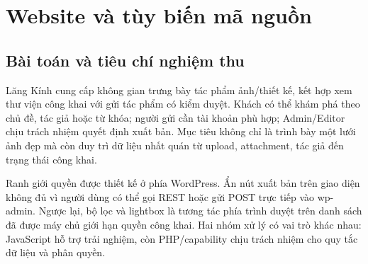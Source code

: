 \chapter{Website và tùy biến mã nguồn}
\label{ch:web}
\section{Bài toán và tiêu chí nghiệm thu}
Lăng Kính cung cấp không gian trưng bày tác phẩm ảnh/thiết kế, kết hợp xem thư viện công khai với gửi tác phẩm có kiểm duyệt. Khách có thể khám phá theo chủ đề, tác giả hoặc từ khóa; người gửi cần tài khoản phù hợp; Admin/Editor chịu trách nhiệm quyết định xuất bản. Mục tiêu không chỉ là trình bày một lưới ảnh đẹp mà còn duy trì dữ liệu nhất quán từ upload, attachment, tác giả đến trạng thái công khai.

Ranh giới quyền được thiết kế ở phía WordPress. Ẩn nút xuất bản trên giao diện không đủ vì người dùng có thể gọi REST hoặc gửi POST trực tiếp vào wp-admin. Ngược lại, bộ lọc và lightbox là tương tác phía trình duyệt trên danh sách đã được máy chủ giới hạn quyền công khai. Hai nhóm xử lý có vai trò khác nhau: JavaScript hỗ trợ trải nghiệm, còn PHP/capability chịu trách nhiệm cho quy tắc dữ liệu và phân quyền.

